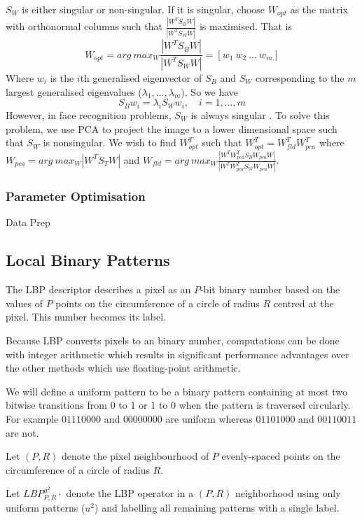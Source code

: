 \documentclass{article}
\begin{document}
$S_W$ is either singular or non-singular. If it is singular, choose $W_{opt}$ as the matrix with orthonormal columns such that $\frac{|W^TS_BW|}{|W^TS_WW|}$ is maximised. That is
\begin{equation}
	W_{opt} = arg\ max_W \frac{|W^TS_BW|}{|W^TS_WW|} = [w_1\ w_2\ \ldots\ w_m]
\end{equation}
Where $w_i$ is the $i$th generalised eigenvector of $S_B$ and $S_W$ corresponding to the $m$ largest generalised eigenvalues ($\lambda_1, \ldots, \lambda_m$). So we have
\begin{equation}
	S_Bw_i = \lambda_iS_Ww_i,\quad i=1, \ldots, m
\end{equation}
However, in face recognition problems, $S_W$ is always singular \cite{belhumeur1997eigenfaces}. To solve this problem, we use PCA to project the image to a lower dimensional space such that $S_W$ is nonsingular. We wish to find $W_{opt}^T$ such that $W_{opt}^T = W_{fld}^TW_{pca}^T$ where $W_{pca} = arg\ max_W|W^TS_TW|$ and $W_{fld} = arg\ max_W\frac{|W^TW_{pca}^TS_BW_{pca}W|}{|W^TW_{pca}^TS_WW_{pca}W|}$.

\subsubsection{Parameter Optimisation}
Data Prep

\subsection{Local Binary Patterns}
The LBP descriptor describes a pixel as an $P$-bit binary number based on the values of $P$ points on the circumference of a circle of radius $R$ centred at the pixel. This number becomes its label.

Because LBP converts pixels to an binary number, computations can be done with integer arithmetic which results in significant performance advantages over the other methods which use floating-point arithmetic.

We will define a uniform pattern to be a binary pattern containing at most two bitwise transitions from 0 to 1 or 1 to 0 when the pattern is traversed circularly. For example $01110000$ and $00000000$ are uniform whereas $01101000$ and $00110011$ are not.

Let $(P, R)$ denote the pixel neighbourhood of $P$ evenly-spaced points on the circumference of a circle of radius $R$.

Let $LBP^{u^2}_{P,R}\cdot$ denote the LBP operator in a $(P, R)$ neighborhood using only uniform patterns ($u^2$) and labelling all remaining patterns with a single label.
\end{document}
